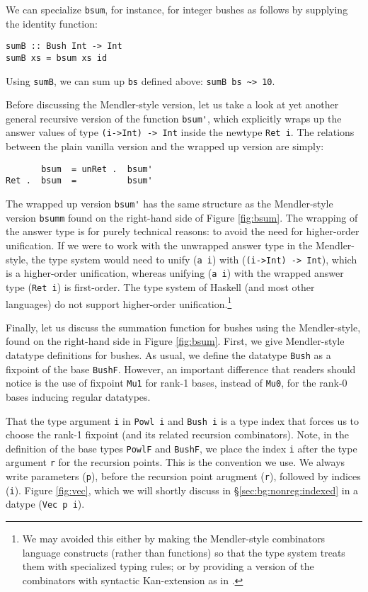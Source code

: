 \documentclass[letterpaper,12pt]{article}
\begin{document}
We can specialize \verb|bsum|, for instance, for integer bushes as follows
by supplying the identity function:
\begin{verbatim}
sumB :: Bush Int -> Int
sumB xs = bsum xs id
\end{verbatim}
Using \verb|sumB|, we can sum up \verb|bs| defined above: \verb|sumB bs ~> 10|.

Before discussing the Mendler-style version, let us take a look at yet another
general recursive version of the function \verb|bsum'|, which explicitly wraps up
the answer values of type \verb|(i->Int) -> Int| inside the newtype \verb|Ret i|.
The relations between the plain vanilla version and the wrapped up version
are simply:
\begin{verbatim}
       bsum  = unRet .  bsum'
Ret .  bsum  =          bsum'
\end{verbatim}
The wrapped up version \verb|bsum'| has the same structure as the Mendler-style
version \verb|bsumm| found on the right-hand side of Figure \ref{fig:bsum}.
The wrapping of the answer type is for purely technical reasons:
to avoid the need for higher-order unification.
If we were to work with the unwrapped answer type in the Mendler-style,
the type system would need to unify (\verb|a i|) with (\verb|(i->Int) -> Int|),
which is a higher-order unification, whereas unifying (\verb|a i|) with
the wrapped answer type (\verb|Ret i|) is first-order.  The type system of Haskell
(and most other languages) do not support higher-order unification.\footnote{
We may avoided this either by making the Mendler-style combinators
language constructs (rather than functions) so that the type system
treats them with specialized typing rules; or by providing a version of
the combinators with syntactic Kan-extension as in \cite{AbeMatUus05}.}

Finally, let us discuss the summation function for bushes using
the Mendler-style, found on the right-hand side in Figure \ref{fig:bsum}.
First, we give Mendler-style datatype definitions for bushes.  As usual,
we define the datatype \verb|Bush| as a fixpoint of the base \verb|BushF|.
However, an important difference that readers should notice is the use of
fixpoint \verb|Mu1| for rank-1 bases, instead of \verb|Mu0|, for the rank-0 bases
inducing regular datatypes.

That the type argument \verb|i| in \verb|Powl i| and \verb|Bush i| is a type index that
forces us to choose the rank-1 fixpoint (and its related recursion combinators).
Note, in the definition of the base types \verb|PowlF| and \verb|BushF|,
we place the index \verb|i| after the type argument \verb|r| for the recursion points.
This is the convention we use.  We always write parameters (\verb|p|), before
the recursion point arugment (\verb|r|), followed by indices (\verb|i|).  
Figure \ref{fig:vec}, which we will shortly discuss in \S\ref{sec:bg:nonreg:indexed}
in a datype (\verb|Vec p i|). 
\end{document}

